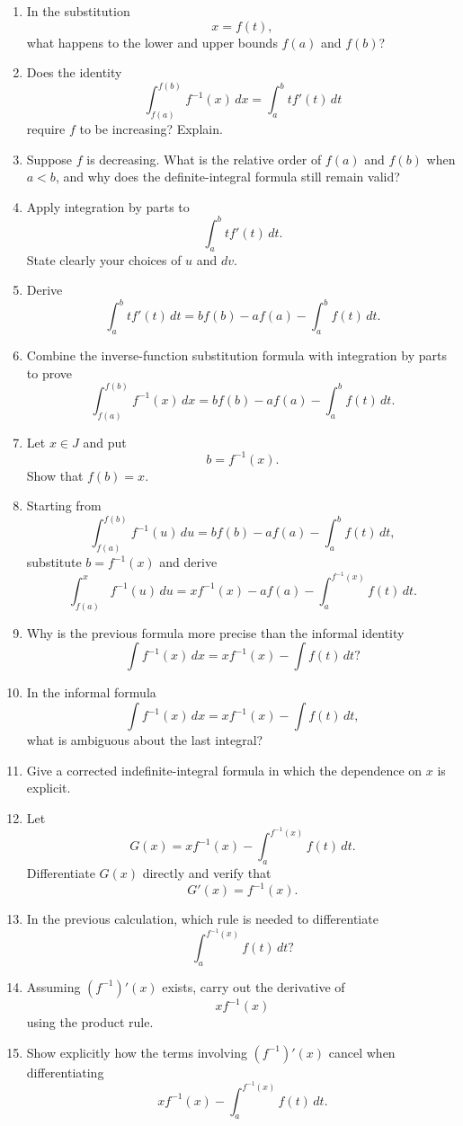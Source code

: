 \begin{enumerate}
  \item In the substitution
    \[ x=f(t), \]
    what happens to the lower and upper bounds \(f(a)\) and \(f(b)\)?
  \item Does the identity
    \[ \int_{f(a)}^{f(b)}f^{-1}(x)\,dx = \int_{a}^{b} t f'(t)\,dt \]
    require \(f\) to be increasing? Explain.
  \item Suppose \(f\) is decreasing. What is the relative order of \(f(a)\) and \(f(b)\) when \(a<b\), and why does the definite-integral formula still remain valid?
  \item Apply integration by parts to
    \[ \int_{a}^{b} t f'(t)\,dt. \]
    State clearly your choices of \(u\) and \(dv\).
  \item Derive
    \[ \int_{a}^{b} t f'(t)\,dt = b f(b)-a f(a)-\int_{a}^{b} f(t)\,dt. \]
  \item Combine the inverse-function substitution formula with integration by parts to prove
    \[ \int_{f(a)}^{f(b)}f^{-1}(x)\,dx = b f(b)-a f(a)-\int_{a}^{b} f(t)\,dt. \]
  \item Let \(x\in J\) and put
    \[ b=f^{-1}(x). \]
    Show that \(f(b)=x\).
  \item Starting from
    \[ \int_{f(a)}^{f(b)}f^{-1}(u)\,du = b f(b)-a f(a)-\int_{a}^{b} f(t)\,dt, \]
    substitute \(b=f^{-1}(x)\) and derive
    \[ \int_{f(a)}^{x} f^{-1}(u)\,du = x f^{-1}(x)-a f(a) - \int_{a}^{f^{-1}(x)}f(t)\,dt. \]
  \item Why is the previous formula more precise than the informal identity
    \[ \int f^{-1}(x)\,dx = x f^{-1}(x)-\int f(t)\,dt? \]
  \item In the informal formula
    \[ \int f^{-1}(x)\,dx = x f^{-1}(x)-\int f(t)\,dt, \]
    what is ambiguous about the last integral?
  \item Give a corrected indefinite-integral formula in which the dependence on \(x\) is explicit.
  \item Let
    \[ G(x) = x f^{-1}(x) - \int_{a}^{f^{-1}(x)}f(t)\,dt. \]
    Differentiate \(G(x)\) directly and verify that
    \[ G'(x)=f^{-1}(x). \]
  \item In the previous calculation, which rule is needed to differentiate
    \[ \int_{a}^{f^{-1}(x)}f(t)\,dt? \]
  \item Assuming \((f^{-1})'(x)\) exists, carry out the derivative of
    \[ x f^{-1}(x) \]
    using the product rule.
  \item Show explicitly how the terms involving \((f^{-1})'(x)\) cancel when differentiating
    \[ x f^{-1}(x) - \int_{a}^{f^{-1}(x)}f(t)\,dt. \]

\end{enumerate}
